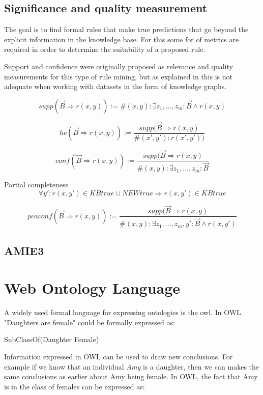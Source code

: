 \subsection{Significance and quality measurement}
The goal is to find formal rules that make true predictions that go beyond the explicit information in the knowledge base. For this some for of metrics are required in order to determine the suitability of a proposed rule.




Support and confidence were originally proposed as relevance and quality measurements for this type of rule mining, but as explained in  this is not adequate when working with datasets in the form of knowledge graphs.

\[supp(\vec{B}\Rightarrow r(x, y)) :=  \# (x, y) : \exists z_1 , ...,z_m : \vec{B} \wedge r(x, y)\]

\[hc(\vec{B}\Rightarrow r(x, y)) := \frac{supp(\vec{B}\Rightarrow r(x, y)}{ \#(x', y'):r(x', y'))}\]

\[conf(\vec{B}\Rightarrow r(x, y)) := \frac{supp(\vec{B}\Rightarrow r(x, y)}{\#(x, y):\exists z_1 ,..., z_m : \vec{B}}\]

Partial completeness
\[\forall y' : r(x, y') \in KBtrue \cup NEWtrue \Rightarrow r(x, y') \in KBtrue\]

\[pcaconf(\vec{B}\Rightarrow r(x, y)) := \frac{supp(\vec{B}\Rightarrow r(x, y)}{\#(x, y):\exists z_1 ,..., z_m, y' : \vec{B} \wedge r(x, y')}\]


\subsection{AMIE3}

\iffalse 
\section{Web Ontology Language}
A widely used formal language for expressing ontologies is the \gls{owl}. In OWL "Daughters are female" could be formally expressed as:

\centerline{\textsf{SubClassOf(Daughter Female)}}
Information expressed in OWL can be used to draw new conclusions. For example if we know that an individual \emph{Amy} is a daughter, then we can makes the same conclusions as earlier about Amy being female. In OWL, the fact that Amy is in the class of females can be expressed as:

